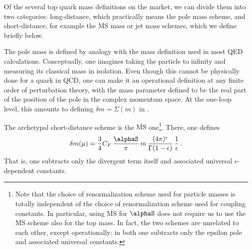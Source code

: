 Of the several top quark mass definitions on the market, we can divide
them into two categories: long-distance, which practically means the
pole mass scheme, and short-distance, for example the
$\overline{\mathrm{MS}}$ mass or jet mass schemes, which we define
briefly below.

The pole mass is defined by analogy with the mass definition used in
most QED calculations.  Conceptually, one imagines taking the particle
to infinity and measuring its classical mass in isolation.  Even though
this cannot be physically done for a quark in QCD, one can make it an
operational definition at any finite order of perturbation theory, with
the mass parameter defined to be the real part of the position of the
pole in the complex momentum space.  At the one-loop level, this amounts
to defining $\delta m=\Sigma(m)$ in .

The archetypal short-distance scheme is the $\overline{\mathrm{MS}}$
one\footnote{Note that the choice of renormalization scheme used for
  particle masses is totally independent of the choice of
  renormalization scheme used for coupling constants. In particular,
  using $\overline{\mathrm{MS}}$ for $\alphaS$ does not require us to
  use the $\overline{\mathrm{MS}}$ scheme also for the top mass. In
  fact, the two schemes are unrelated to each other, except
  operationally: in both one subtracts only the epsilon pole and
  associated universal constants.}.  There, one defines
\begin{equation}
  \delta m(\mu) = \frac34C_F\,\frac{\alphaS}{\pi}\,m
  \,\frac{(4\pi)^{\epsilon}}{\Gamma(1-\epsilon)}\,\frac1\epsilon\,.
\end{equation}
That is, one subtracts only the divergent term itself and associated
universal $\epsilon$-dependent constants.

